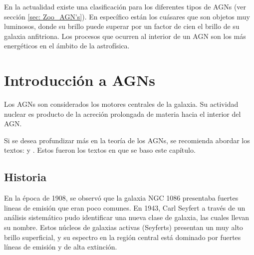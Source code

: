 

En la actualidad existe una clasificación para los diferentes tipos de AGNs (ver sección \ref{sec: Zoo_AGN's}). En específico están los cuásares que son objetos muy luminosos, donde su brillo puede superar por un factor de cien el brillo de su galaxia anfitriona. Los procesos que ocurren al interior de un AGN son los más energéticos en el ámbito de la astrofísica. 


\section{Introducción a AGNs}
\label{sec:Introduction_AGNs}

Los AGNs son considerados los motores centrales de la galaxia. Su actividad nuclear es producto de la acreción prolongada de materia hacia el interior del AGN. 

Si se desea profundizar más en la teoría de los AGNs, se recomienda abordar los textos: \cite{schneider2006} y \cite{carroll2007}. Estos fueron los textos en que se baso este capítulo. 


	\subsection{Historia}
	\label{subsec:History}
	
En la época de 1908, se observó que la galaxia NGC 1086 presentaba fuertes lineas de emisión que eran poco comunes. En 1943, Carl Seyfert a través de un análisis sistemático pudo identificar una nueva clase de galaxia, las cuales llevan su nombre. Estos núcleos de galaxias activas (Seyferts) presentan un muy alto brillo superficial, y su espectro en la región central está dominado por fuertes líneas de emisión y de alta extinción.  

